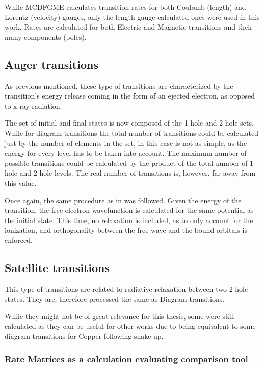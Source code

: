 While \gls{MCDFGME} calculates transition rates for both Coulomb (length) and Lorentz (velocity) gauges, only the length gauge calculated ones were used in this work. Rates are calculated for both Electric and Magnetic transitions and their many components (poles).

\subsection{Auger transitions}

As previous mentioned, these type of transitions are characterized by the transition's energy release coming in the form of an ejected electron, as opposed to x-ray radiation.

The set of initial and final states is now composed of the 1-hole and 2-hole sets. While for diagram transitions the total number of transitions could be calculated just by the number of elements in the set, in this case is not as simple, as the energy for every level has to be taken into account. The maximum number of possible transitions could be calculated by the product of the total number of 1-hole and 2-hole levels. The real number of transitions is, however, far away from this value.

Once again, the same procedure as in \cite{Guerra2021,Pinheiro2023} was followed. Given the energy of the transition, the free electron wavefunction is calculated for the same potential as the initial state. This time, no relaxation is included, as to only account for the ionization, and orthogonality between the free wave and the bound orbitals is enforced.


\subsection{Satellite transitions}
This type of transitions are related to radiative relaxation between two 2-hole states. They are, therefore processed the same as Diagram transitions.

While they might not be of great relevance for this thesis, some were still calculated as they can be useful for other works due to being equivalent to some diagram transitions for Copper following shake-up.

\subsubsection{Rate Matrices as a calculation evaluating comparison tool}

